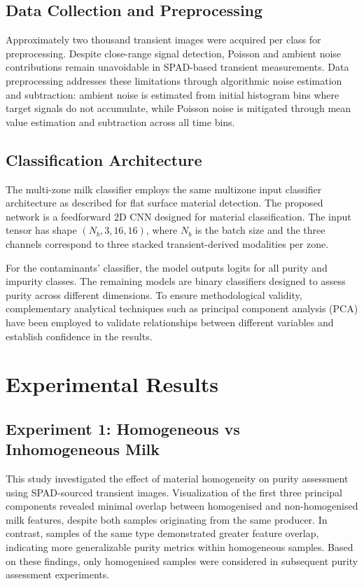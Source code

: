 \documentclass[11pt]{article}
\begin{document}
\subsection{Data Collection and Preprocessing}

Approximately two thousand transient images were acquired per class for preprocessing. Despite close-range signal detection, Poisson and ambient noise contributions remain unavoidable in SPAD-based transient measurements. Data preprocessing addresses these limitations through algorithmic noise estimation and subtraction: ambient noise is estimated from initial histogram bins where target signals do not accumulate, while Poisson noise is mitigated through mean value estimation and subtraction across all time bins.

\subsection{Classification Architecture}

The multi-zone milk classifier employs the same multizone input classifier architecture as described for flat surface material detection. The proposed network is a feedforward 2D CNN designed for material classification. The input tensor has shape $(N_b, 3, 16, 16)$, where $N_b$ is the batch size and the three channels correspond to three stacked transient-derived modalities per zone.

For the contaminants' classifier, the model outputs logits for all purity and impurity classes. The remaining models are binary classifiers designed to assess purity across different dimensions. To ensure methodological validity, complementary analytical techniques such as principal component analysis (PCA) have been employed to validate relationships between different variables and establish confidence in the results.

\section{Experimental Results}

\subsection{Experiment 1: Homogeneous vs Inhomogeneous Milk}

This study investigated the effect of material homogeneity on purity assessment using SPAD-sourced transient images. Visualization of the first three principal components revealed minimal overlap between homogenised and non-homogenised milk features, despite both samples originating from the same producer. In contrast, samples of the same type demonstrated greater feature overlap, indicating more generalizable purity metrics within homogeneous samples. Based on these findings, only homogenised samples were considered in subsequent purity assessment experiments.
\end{document}
